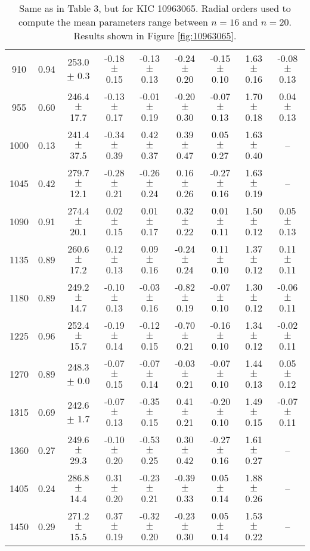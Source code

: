 \documentclass[twocolumn]{aastex61}%
\begin{document}
\begin{table*}[ht]
\begin{tabular}{ccc|ccccc|c}
910 & 0.94 & 253.0 $\pm$ 0.3 & -0.18 $\pm$ 0.15 & -0.13 $\pm$ 0.13 & -0.24 $\pm$ 0.20 & -0.15 $\pm$ 0.10 & 1.63 $\pm$ 0.16 & -0.08 $\pm$ 0.13\\
955 & 0.60 & 246.4 $\pm$ 17.7 & -0.13 $\pm$ 0.17 & -0.01 $\pm$ 0.19 & -0.20 $\pm$ 0.30 & -0.07 $\pm$ 0.13 & 1.70 $\pm$ 0.18 & 0.04 $\pm$ 0.13\\
1000 & 0.13 & 241.4 $\pm$ 37.5 & -0.34 $\pm$ 0.39 & 0.42 $\pm$ 0.37 & 0.39 $\pm$ 0.47 & 0.05 $\pm$ 0.27 & 1.63 $\pm$ 0.40 & --\\
1045 & 0.42 & 279.7 $\pm$ 12.1 & -0.28 $\pm$ 0.21 & -0.26 $\pm$ 0.24 & 0.16 $\pm$ 0.26 & -0.27 $\pm$ 0.16 & 1.63 $\pm$ 0.19 & --\\
1090 & 0.91 & 274.4 $\pm$ 20.1 & 0.02 $\pm$ 0.15 & 0.01 $\pm$ 0.17 & 0.32 $\pm$ 0.22 & 0.01 $\pm$ 0.11 & 1.50 $\pm$ 0.12 & 0.05 $\pm$ 0.13\\
1135 & 0.89 & 260.6 $\pm$ 17.2 & 0.12 $\pm$ 0.13 & 0.09 $\pm$ 0.16 & -0.24 $\pm$ 0.24 & 0.11 $\pm$ 0.10 & 1.37 $\pm$ 0.12 & 0.11 $\pm$ 0.11\\
1180 & 0.89 & 249.2 $\pm$ 14.7 & -0.10 $\pm$ 0.13 & -0.03 $\pm$ 0.16 & -0.82 $\pm$ 0.19 & -0.07 $\pm$ 0.10 & 1.30 $\pm$ 0.12 & -0.06 $\pm$ 0.11\\
1225 & 0.96 & 252.4 $\pm$ 15.7 & -0.19 $\pm$ 0.14 & -0.12 $\pm$ 0.15 & -0.70 $\pm$ 0.21 & -0.16 $\pm$ 0.10 & 1.34 $\pm$ 0.12 & -0.02 $\pm$ 0.11\\
1270 & 0.89 & 248.3 $\pm$ 0.0 & -0.07 $\pm$ 0.15 & -0.07 $\pm$ 0.14 & -0.03 $\pm$ 0.21 & -0.07 $\pm$ 0.10 & 1.44 $\pm$ 0.13 & 0.05 $\pm$ 0.12\\
1315 & 0.69 & 242.6 $\pm$ 1.7 & -0.07 $\pm$ 0.13 & -0.35 $\pm$ 0.15 & 0.41 $\pm$ 0.21 & -0.20 $\pm$ 0.10 & 1.49 $\pm$ 0.15 & -0.07 $\pm$ 0.11\\
1360 & 0.27 & 249.6 $\pm$ 29.3 & -0.10 $\pm$ 0.20 & -0.53 $\pm$ 0.25 & 0.30 $\pm$ 0.42 & -0.27 $\pm$ 0.16 & 1.61 $\pm$ 0.27 & --\\
1405 & 0.24 & 286.8 $\pm$ 14.4 & 0.31 $\pm$ 0.20 & -0.23 $\pm$ 0.21 & -0.39 $\pm$ 0.33 & 0.05 $\pm$ 0.14 & 1.88 $\pm$ 0.26 & --\\
1450 & 0.29 & 271.2 $\pm$ 15.5 & 0.37 $\pm$ 0.19 & -0.32 $\pm$ 0.20 & -0.23 $\pm$ 0.30 & 0.05 $\pm$ 0.14 & 1.53 $\pm$ 0.22 & --\\
\end{tabular}
\caption{Same as in Table 3, but for KIC 10963065. Radial orders used to compute the mean parameters range between $n=16$ and $n=20$. Results shown in Figure \ref{fig:10963065}.}\label{tab:10963065}\vspace{-1.5cm}
\end{table*}
\end{document}
